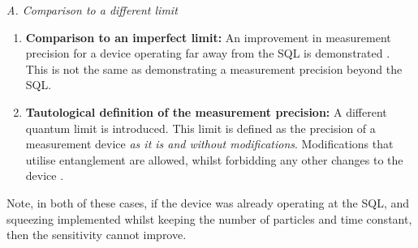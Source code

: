 \documentclass[reqno]{amsart}
\begin{document}
\noindent\textit{A. Comparison to a different limit}
\begin{enumerate}
\item \textbf{Comparison to an imperfect limit:} An improvement in measurement precision for a device operating far away from the SQL is demonstrated \cite{Abadie2011, Aasi2013, Tse2019, Casacio2021}. This is not the same as demonstrating a measurement precision beyond the SQL. %

\item \textbf{Tautological definition of the measurement precision:} A different quantum limit is introduced. This limit is defined as the precision of a measurement device \emph{as it is and without modifications}. Modifications that utilise entanglement are allowed, whilst forbidding any other changes to the device \cite{Wu1986, Xiao1987, Taylor2013}.%
\end{enumerate}
Note, in both of these cases, if the device was already operating at the SQL, and squeezing implemented whilst keeping the number of particles and time constant, then the sensitivity cannot improve.
\end{document}
